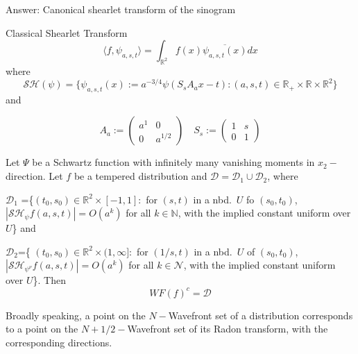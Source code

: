 \begin{frame}{Answer: Canonical shearlet transform of the sinogram}
\begin{block}{Classical Shearlet Transform}
$$
\langle f,\psi_{a,s,t}\rangle =\int_{\mathbb{R}^2}f(x)\overline{\psi_{a,s,t}(x)}dx
$$
where
$$
\mathcal{SH}(\psi)=\{\psi_{a,s,t}(x):=a^{-3/4}\psi (S_sA_ax-t):(a,s,t)\in \mathbb{R}_+\times\mathbb{R}\times\mathbb{R}^2\}
$$
and

$$
A_a:=
\left(
\begin{matrix}
a^1 & 0 \\
0 & a^{1/2}
\end{matrix}
\right)
\quad
S_s:=
\left(
\begin{matrix}
1 & s \\
0 & 1
\end{matrix}
\right)
$$
\end{block}
\end{frame}

\begin{frame}

\begin{theorem} 
Let $\Psi$ be a Schwartz function with infinitely many vanishing moments in $x_2-$direction. Let $f$ be a tempered distribution and $\mathcal{D}=\mathcal{D}_1\cup\mathcal{D}_2$, where

 $\mathcal{D}_1$ =\{$(t_0,s_0)\in \mathbb{R}^2\times [-1,1]:$ for $(s,t)$ in a nbd.\ $U$ fo $(s_0,t_0)$, $|\mathcal{SH}_{\psi}f(a,s,t)|=O(a^k)$ for all $k\in\mathbb{N}$, with the implied constant uniform over $U$\} and

$\mathcal{D}_2$=\{ $(t_0,s_0)\in\mathbb{R}^2\times (1,\infty]:$ for $(1/s,t)$ in a nbd.\ $U$ of $(s_0,t_0)$, $|\mathcal{SH}_{\psi ^{\nu}}f(a,s,t)|=O(a^k)$ for all $k\in\mathcal{N}$, with the implied constant uniform over $U$\}. Then
$$
WF(f)^c=\mathcal{D}
$$
\end{theorem}

\pause

\begin{theorem}[O. \"Otkem et al., 2008]
Broadly speaking, a point on the $N-$Wavefront set of a distribution corresponds to a point on the $N+1/2-$Wavefront set of its Radon transform, with the corresponding directions.
\end{theorem}
\end{frame}

